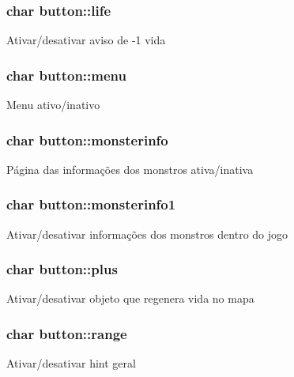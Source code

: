 \subsubsection[{\texorpdfstring{life}{life}}]{\setlength{\rightskip}{0pt plus 5cm}char button\+::life}\hypertarget{structbutton_ab4e066179b4fbd5477093c096850c3a7}{}\label{structbutton_ab4e066179b4fbd5477093c096850c3a7}
Ativar/desativar aviso de -\/1 vida 
\subsubsection[{\texorpdfstring{menu}{menu}}]{\setlength{\rightskip}{0pt plus 5cm}char button\+::menu}\hypertarget{structbutton_a4d9741b925ef0f23771c335b4ff92dee}{}\label{structbutton_a4d9741b925ef0f23771c335b4ff92dee}
Menu ativo/inativo 
\subsubsection[{\texorpdfstring{monsterinfo}{monsterinfo}}]{\setlength{\rightskip}{0pt plus 5cm}char button\+::monsterinfo}\hypertarget{structbutton_a4a499a690e06dfcd252b5864bb38d7e1}{}\label{structbutton_a4a499a690e06dfcd252b5864bb38d7e1}
Página das informações dos monstros ativa/inativa 
\subsubsection[{\texorpdfstring{monsterinfo1}{monsterinfo1}}]{\setlength{\rightskip}{0pt plus 5cm}char button\+::monsterinfo1}\hypertarget{structbutton_aa94cb302b46e76753a1f647d77f686f0}{}\label{structbutton_aa94cb302b46e76753a1f647d77f686f0}
Ativar/desativar informações dos monstros dentro do jogo 
\subsubsection[{\texorpdfstring{plus}{plus}}]{\setlength{\rightskip}{0pt plus 5cm}char button\+::plus}\hypertarget{structbutton_a52e46dd860de1b0afac5e129bbf9558e}{}\label{structbutton_a52e46dd860de1b0afac5e129bbf9558e}
Ativar/desativar objeto que regenera vida no mapa 
\subsubsection[{\texorpdfstring{range}{range}}]{\setlength{\rightskip}{0pt plus 5cm}char button\+::range}\hypertarget{structbutton_af31456c0c03cc93a833bf936cdaa481d}{}\label{structbutton_af31456c0c03cc93a833bf936cdaa481d}
Ativar/desativar hint geral 
